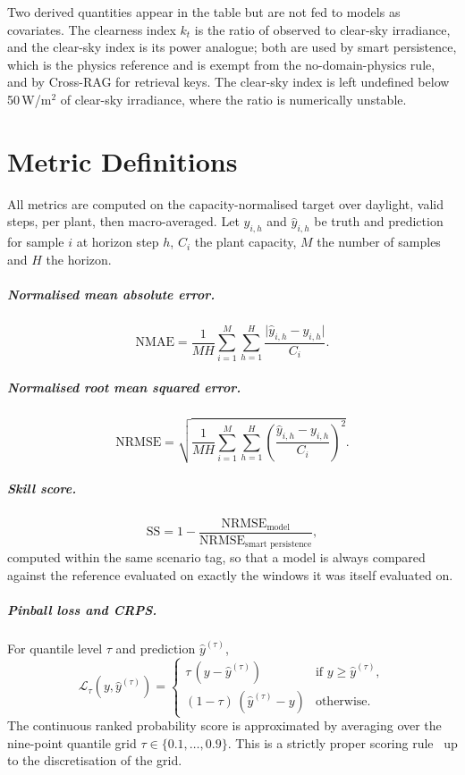 Two derived quantities appear in the table but are not fed to models as covariates. The
clearness index $k_t$ is the ratio of observed to clear-sky irradiance, and the clear-sky
index is its power analogue; both are used by smart persistence, which is the physics
reference and is exempt from the no-domain-physics rule, and by Cross-RAG for retrieval keys.
The clear-sky index is left undefined below 50\,W/m$^2$ of clear-sky irradiance, where the
ratio is numerically unstable.


\chapter{Metric Definitions}
\label{app:metrics}

All metrics are computed on the capacity-normalised target over daylight, valid steps, per
plant, then macro-averaged. Let $y_{i,h}$ and $\hat{y}_{i,h}$ be truth and prediction for
sample $i$ at horizon step $h$, $C_i$ the plant capacity, $M$ the number of samples and $H$
the horizon.

\paragraph{Normalised mean absolute error.}
\[
  \mathrm{NMAE} = \frac{1}{MH} \sum_{i=1}^{M}\sum_{h=1}^{H}
  \frac{\lvert \hat{y}_{i,h} - y_{i,h} \rvert}{C_i}.
\]

\paragraph{Normalised root mean squared error.}
\[
  \mathrm{NRMSE} = \sqrt{\frac{1}{MH}\sum_{i=1}^{M}\sum_{h=1}^{H}
  \left(\frac{\hat{y}_{i,h}-y_{i,h}}{C_i}\right)^{\!2}}.
\]

\paragraph{Skill score.}
\[
  \mathrm{SS} = 1 - \frac{\mathrm{NRMSE}_{\text{model}}}
                        {\mathrm{NRMSE}_{\text{smart persistence}}},
\]
computed within the same scenario tag, so that a model is always compared against the
reference evaluated on exactly the windows it was itself evaluated on.

\paragraph{Pinball loss and CRPS.} For quantile level $\tau$ and prediction
$\hat{y}^{(\tau)}$,
\[
  \mathcal{L}_\tau(y, \hat{y}^{(\tau)}) =
  \begin{cases}
    \tau\,(y - \hat{y}^{(\tau)}) & \text{if } y \ge \hat{y}^{(\tau)},\\[2pt]
    (1-\tau)\,(\hat{y}^{(\tau)} - y) & \text{otherwise.}
  \end{cases}
\]
The continuous ranked probability score is approximated by averaging over the nine-point
quantile grid $\tau \in \{0.1, \ldots, 0.9\}$. This is a strictly proper scoring
rule~\cite{gneiting} up to the discretisation of the grid.

